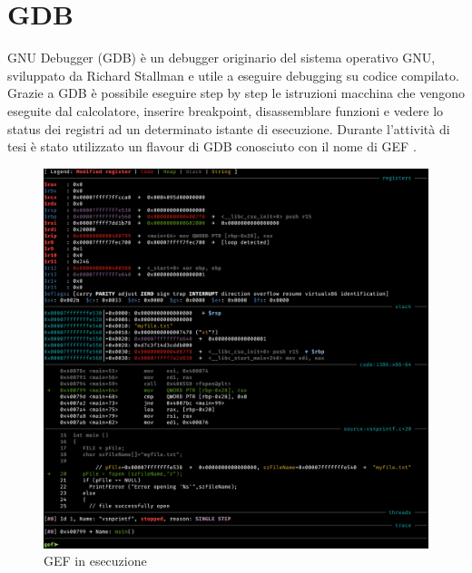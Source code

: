 \section*{GDB}
GNU Debugger (GDB) \cite{GDB} è un debugger originario del sistema operativo GNU, sviluppato da Richard Stallman e utile a eseguire debugging su codice compilato. Grazie a GDB è possibile eseguire step by step le istruzioni macchina che vengono eseguite dal calcolatore, inserire breakpoint, disassemblare funzioni e vedere lo status dei registri ad un determinato istante di esecuzione. Durante l'attività di tesi è stato utilizzato un flavour di GDB conosciuto con il nome di GEF \cite{GEF}.
\vspace{1cm}
\FloatBarrier
\begin{figure}[!htbp]
    \centering
    \includegraphics[width=0.57\linewidth]{images/gef.png}
    \caption{GEF in esecuzione} 
\end{figure}
\FloatBarrier
\vspace{1cm}
